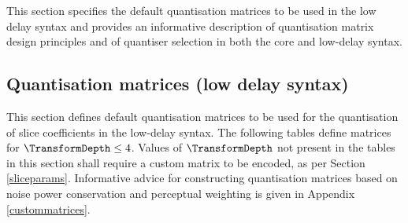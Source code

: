 \label{quantmatrices}

This section specifies the default quantisation matrices to be used
in the low delay syntax and provides an informative description of quantisation
matrix design principles and of quantiser selection in both the core
and low-delay syntax.

\subsection{Quantisation matrices (low delay syntax)}
\label{defaultquantmatrices}

This section defines default quantisation matrices to be used 
for the quantisation of slice coefficients in the low-delay syntax.
The following tables define matrices for $\TransformDepth\leq 4$. 
Values of $\TransformDepth$ not present in the tables
in this section shall require a custom matrix to be encoded, 
as per Section \ref{sliceparams}. Informative advice for 
constructing quantisation matrices based on noise power 
conservation and perceptual weighting is given in 
Appendix \ref{custommatrices}.

